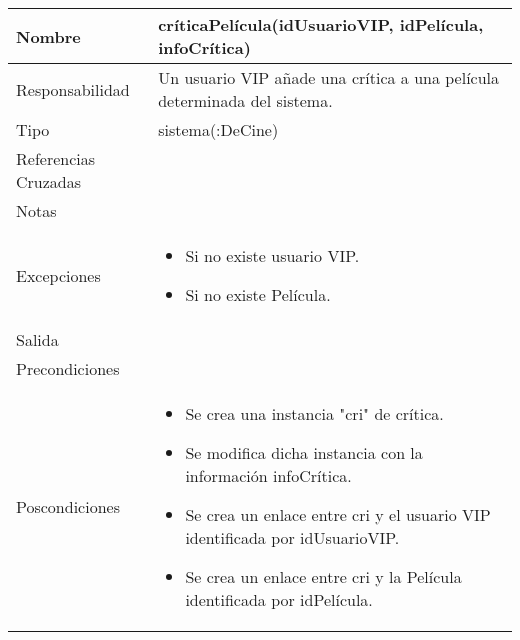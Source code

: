 \documentclass{article}
\begin{document}
\begin{table}[h]
\begin{tabular}{|l|l|l|l|l|l|}
\hline
\multicolumn{2}{|p{3cm}|}{Nombre} & \multicolumn{4}{p{10cm}|}{\textbf{críticaPelícula(idUsuarioVIP, idPelícula, infoCrítica)}}\\
\hline
\multicolumn{2}{|p{3cm}|}{Responsabilidad} & \multicolumn{4}{p{10cm}|}{Un usuario VIP añade una crítica a una película determinada del sistema.} \\
\hline
\multicolumn{2}{|p{3cm}|}{Tipo} & \multicolumn{4}{p{10cm}|}{sistema(:DeCine)} \\
\hline
\multicolumn{2}{|p{3cm}|}{Referencias Cruzadas} & \multicolumn{4}{p{10cm}|}{} \\
\hline
\multicolumn{2}{|p{3cm}|}{Notas} & \multicolumn{4}{p{10cm}|}{} \\
\hline
\multicolumn{2}{|p{3cm}|}{Excepciones} & \multicolumn{4}{p{10cm}|}{\begin{itemize}
\item Si no existe usuario VIP.
\item Si no existe Película.
\end{itemize}} \\
\hline
\multicolumn{2}{|p{3cm}|}{Salida} & \multicolumn{4}{p{10cm}|}{} \\
\hline
\multicolumn{2}{|p{3cm}|}{Precondiciones} & \multicolumn{4}{p{10cm}|}{} \\
\hline
\multicolumn{2}{|p{3cm}|}{Poscondiciones} & \multicolumn{4}{p{10cm}|}{\begin{itemize}
\item Se crea una instancia "cri" de crítica.
\item Se modifica dicha instancia con la información infoCrítica.
\item Se crea un enlace entre cri y el usuario VIP identificada por idUsuarioVIP.
\item Se crea un enlace entre cri y la Película identificada por idPelícula.
\end{itemize}} \\
\hline
\end{tabular}
\end{table}
\end{document}

